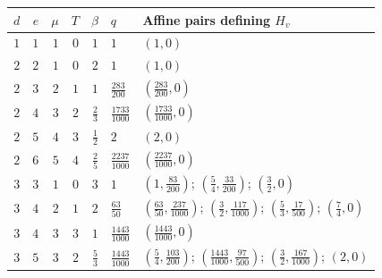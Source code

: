 \begin{center}
\scriptsize
\begin{tabular}{rrrrrlp{7.0cm}}
\hline
$d$ & $e$ & $\mu$ & $T$ & $\beta$ & $q$ & Affine pairs defining $H_v$ \\
\hline
\(1\) & \(1\) & \(1\) & \(0\) & \(1\) & \(1\) & \((1,0)\) \\[3pt]
\(2\) & \(2\) & \(1\) & \(0\) & \(2\) & \(1\) & \((1,0)\) \\[3pt]
\(2\) & \(3\) & \(2\) & \(1\) & \(1\) & \(\tfrac{283}{200}\) & \((\tfrac{283}{200},0)\) \\[3pt]
\(2\) & \(4\) & \(3\) & \(2\) & \(\tfrac{2}{3}\) & \(\tfrac{1733}{1000}\) & \((\tfrac{1733}{1000},0)\) \\[3pt]
\(2\) & \(5\) & \(4\) & \(3\) & \(\tfrac{1}{2}\) & \(2\) & \((2,0)\) \\[3pt]
\(2\) & \(6\) & \(5\) & \(4\) & \(\tfrac{2}{5}\) & \(\tfrac{2237}{1000}\) & \((\tfrac{2237}{1000},0)\) \\[3pt]
\(3\) & \(3\) & \(1\) & \(0\) & \(3\) & \(1\) & \((1,\tfrac{83}{200})\); \((\tfrac{5}{4},\tfrac{33}{200})\); \((\tfrac{3}{2},0)\) \\[3pt]
\(3\) & \(4\) & \(2\) & \(1\) & \(2\) & \(\tfrac{63}{50}\) & \((\tfrac{63}{50},\tfrac{237}{1000})\); \((\tfrac{3}{2},\tfrac{117}{1000})\); \((\tfrac{5}{3},\tfrac{17}{500})\); \((\tfrac{7}{4},0)\) \\[3pt]
\(3\) & \(4\) & \(3\) & \(3\) & \(1\) & \(\tfrac{1443}{1000}\) & \((\tfrac{1443}{1000},0)\) \\[3pt]
\(3\) & \(5\) & \(3\) & \(2\) & \(\tfrac{5}{3}\) & \(\tfrac{1443}{1000}\) & \((\tfrac{5}{4},\tfrac{103}{200})\); \((\tfrac{1443}{1000},\tfrac{97}{500})\); \((\tfrac{3}{2},\tfrac{167}{1000})\); \((2,0)\) \\[3pt]
\hline
\end{tabular}
\end{center}
